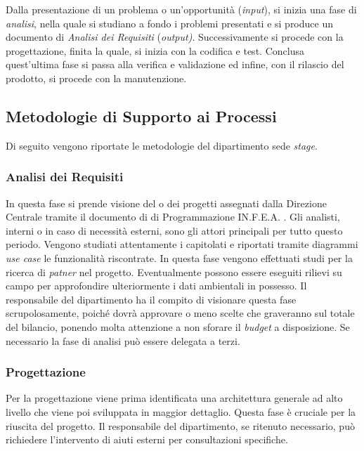 Dalla presentazione di un problema o un'opportunità (\textit{input}), si inizia una fase di \textit{analisi}, nella quale si studiano a fondo i problemi presentati e si produce un documento di \textit{Analisi dei Requisiti} (\textit{output)}. Successivamente si procede con la progettazione, finita la quale, si inizia con la codifica e test. Conclusa quest'ultima fase si passa alla verifica  e validazione ed infine, con il rilascio del prodotto, si procede con la manutenzione.

 
\subsection{Metodologie di Supporto ai Processi}

Di seguito vengono riportate le metodologie del dipartimento sede \textit{stage}.

\subsubsection{Analisi dei Requisiti}

In questa fase si prende visione del o dei progetti assegnati dalla Direzione Centrale tramite il documento di di Programmazione IN.F.E.A. . Gli analisti, interni o in caso di necessità esterni, sono gli attori principali per tutto questo periodo. Vengono studiati attentamente i capitolati e riportati tramite diagrammi \textit{use case} le funzionalità riscontrate. In questa fase vengono effettuati studi per la ricerca di \textit{patner} nel progetto. Eventualmente possono essere eseguiti rilievi su campo per approfondire ulteriormente i dati ambientali in possesso. Il responsabile del dipartimento ha il compito di visionare questa fase scrupolosamente, poiché dovrà approvare o meno scelte che graveranno sul totale del bilancio, ponendo molta attenzione a non sforare il \textit{budget} a disposizione. Se necessario la fase di analisi può essere delegata a terzi.

\subsubsection{Progettazione}

Per la progettazione viene prima identificata una architettura generale ad alto livello che viene poi sviluppata in maggior dettaglio. Questa fase è cruciale per la riuscita del progetto. Il responsabile del dipartimento, se ritenuto necessario, può richiedere l'intervento di aiuti esterni per consultazioni specifiche.

